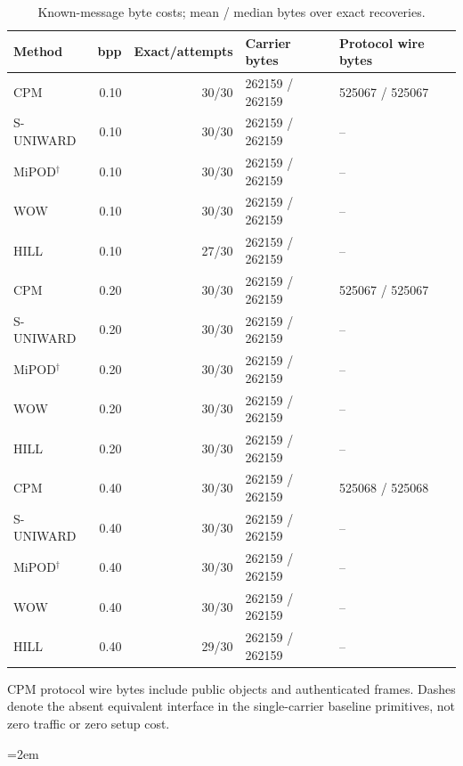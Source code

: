 \documentclass[journal]{IEEEtran}
\renewcommand{\arraystretch}{1.2}
\renewcommand{\arraystretch}{1.0}
\theoremstyle{definition}
\theoremstyle{game}
\renewcommand{\arraystretch}{1.5}
\begin{document}
\begin{table}[!t]
\centering\footnotesize
\caption{Known-message byte costs; mean / median bytes over exact recoveries.}
\label{tab:hsm-fresh-bytes}
\setlength{\tabcolsep}{4pt}\renewcommand{\arraystretch}{1.15}
\begin{tabular}{lrrll}
\toprule
Method & bpp & Exact/attempts & Carrier bytes & Protocol wire bytes\\
\midrule
CPM & 0.10 & 30/30 & 262159 / 262159 & 525067 / 525067\\
S-UNIWARD & 0.10 & 30/30 & 262159 / 262159 & --\\
MiPOD$^\dagger$ & 0.10 & 30/30 & 262159 / 262159 & --\\
WOW & 0.10 & 30/30 & 262159 / 262159 & --\\
HILL & 0.10 & 27/30 & 262159 / 262159 & --\\
CPM & 0.20 & 30/30 & 262159 / 262159 & 525067 / 525067\\
S-UNIWARD & 0.20 & 30/30 & 262159 / 262159 & --\\
MiPOD$^\dagger$ & 0.20 & 30/30 & 262159 / 262159 & --\\
WOW & 0.20 & 30/30 & 262159 / 262159 & --\\
HILL & 0.20 & 30/30 & 262159 / 262159 & --\\
CPM & 0.40 & 30/30 & 262159 / 262159 & 525068 / 525068\\
S-UNIWARD & 0.40 & 30/30 & 262159 / 262159 & --\\
MiPOD$^\dagger$ & 0.40 & 30/30 & 262159 / 262159 & --\\
WOW & 0.40 & 30/30 & 262159 / 262159 & --\\
HILL & 0.40 & 29/30 & 262159 / 262159 & --\\
\bottomrule
\end{tabular}
\par\smallskip\parbox{.97\textwidth}{\footnotesize CPM protocol wire bytes include public objects and authenticated frames. Dashes denote the absent equivalent interface in the single-carrier baseline primitives, not zero traffic or zero setup cost.}
\end{table}

\clearpage

%
\begingroup
\sloppy
\emergencystretch=2em

\endgroup













\end{document}
